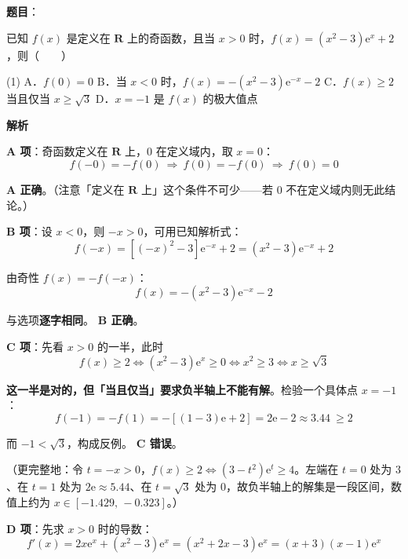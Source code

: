 \begin{answer}

\textbf{题目}：

已知 $f(x)$ 是定义在 $\mathbf{R}$ 上的奇函数，且当 $x>0$ 时，$f(x)=\left(x^2-3\right)\mathrm{e}^{x}+2$，则\mbox{（　　）}

\begin{gkopts}(1)
\task A．$f(0)=0$
\task B．当 $x<0$ 时，$f(x)=-\left(x^2-3\right)\mathrm{e}^{-x}-2$
\task C．$f(x)\ge 2$ 当且仅当 $x\ge\sqrt3$
\task D．$x=-1$ 是 $f(x)$ 的极大值点
\end{gkopts}

\textbf{解析}

\par\medskip

\textbf{A 项}：奇函数定义在 $\mathbf R$ 上，$0$ 在定义域内，取 $x=0$：
\nopagebreak[4]
\[f(-0)=-f(0)\ \Longrightarrow\ f(0)=-f(0)\ \Longrightarrow\ f(0)=0\]

 \textbf{A 正确}。（注意「定义在 $\mathbf R$ 上」这个条件不可少——若 $0$ 不在定义域内则无此结论。）

\textbf{B 项}：设 $x<0$，则 $-x>0$，可用已知解析式：
\nopagebreak[4]
\[f(-x)=\left[(-x)^2-3\right]\mathrm{e}^{-x}+2=\left(x^2-3\right)\mathrm{e}^{-x}+2\]

由奇性 $f(x)=-f(-x)$：
\nopagebreak[4]
\[f(x)=-\left(x^2-3\right)\mathrm{e}^{-x}-2\]

与选项\textbf{逐字相同}。 \textbf{B 正确}。

\textbf{C 项}：先看 $x>0$ 的一半，此时
\nopagebreak[4]
\[f(x)\ge2\iff\left(x^2-3\right)\mathrm{e}^{x}\ge0\iff x^2\ge3\iff x\ge\sqrt3\]

\textbf{这一半是对的，但「当且仅当」要求负半轴上不能有解}。检验一个具体点 $x=-1$：
\nopagebreak[4]
\[f(-1)=-f(1)=-\left[\left(1-3\right)\mathrm{e}+2\right]=2\mathrm{e}-2\approx3.44\ \ge2\]

而 $-1<\sqrt3$，构成反例。 \textbf{C 错误}。

（更完整地：令 $t=-x>0$，$f(x)\ge2\iff\left(3-t^2\right)\mathrm{e}^{t}\ge4$。左端在 $t=0$ 处为 $3$、在 $t=1$ 处为 $2\mathrm{e}\approx5.44$、在 $t=\sqrt3$ 处为 $0$，故负半轴上的解集是一段区间，数值上约为 $x\in[-1.429,\,-0.323]$。）

\textbf{D 项}：先求 $x>0$ 时的导数：
\nopagebreak[4]
\[f'(x)=2x\mathrm{e}^{x}+\left(x^2-3\right)\mathrm{e}^{x}=\left(x^2+2x-3\right)\mathrm{e}^{x}=(x+3)(x-1)\mathrm{e}^{x}\]


\end{answer}
